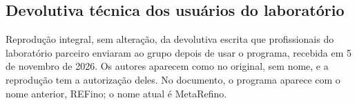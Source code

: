 
\begin{anexosenv}

\partanexos

\chapter{Devolutiva técnica dos usuários do laboratório}
\label{anexo:devolutiva}
Reprodução integral, sem alteração, da devolutiva escrita que profissionais do laboratório parceiro
enviaram ao grupo depois de usar o programa, recebida em 5 de novembro de 2026. Os autores aparecem
como no original, sem nome, e a reprodução tem a autorização deles. No documento, o programa aparece com o nome anterior, REFino; o nome
atual é MetaRefino.





\end{anexosenv}